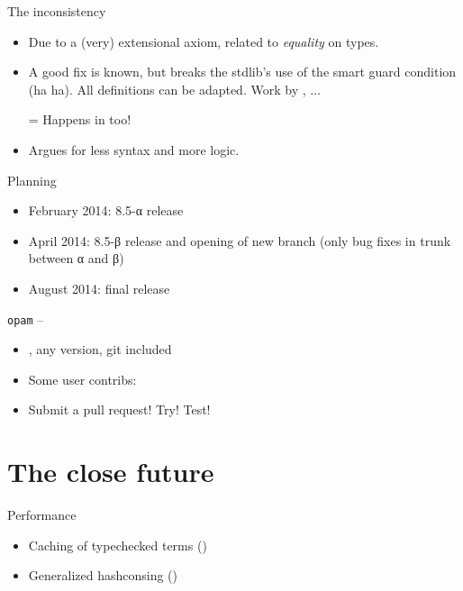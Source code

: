 \begin{subsecframe}{The inconsistency}
  \begin{itemize}
  \item Due to a (very) extensional axiom, related to \emph{equality} on
    types.
  \item A good fix is known, but breaks the stdlib's use of the smart
    guard condition (ha ha). All definitions can be adapted. Work by
    , $\ldots$
  \item[=] Happens in  too!
  \item Argues for less syntax and more logic.
  \end{itemize}
\end{subsecframe}

\begin{subsecframe}{Planning}
  \begin{itemize}
  \item February 2014: 8.5-α release
  \item April 2014: 8.5-β release and opening of new branch
    (only bug fixes in trunk between α and β)
  \item August 2014: final release
  \end{itemize}
\end{subsecframe}

\begin{subsecframe}{\texttt{opam} -- }
  
  \begin{itemize}
  \item {}, any version, git included
  \item Some user contribs: 
  \item Submit a pull request! Try! Test!
  \end{itemize}

\end{subsecframe}


\section{The close future}

\begin{subsecframe}{Performance}

  \begin{itemize}
  \item Caching of typechecked terms ()
  \item Generalized hashconsing ()
  \end{itemize}
  
\end{subsecframe}

